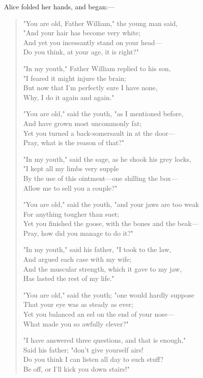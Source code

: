 Alice folded her hands, and began:—
​
\begin{verse}
\footnotesize
"You are old, Father William," the young man said,\\
⁠"And your hair has become very white;\\
And yet you incessantly stand on your head—\\
⁠Do you think, at your age, it is right?"

"In my youth," Father William replied to his son,\\
⁠"I feared it might injure the brain;\\
But now that I'm perfectly sure I have none,\\
⁠Why, I do it again and again."

"You are old," said the youth, "as I mentioned before,\\
⁠And have grown most uncommonly fat;\\
Yet you turned a back-somersault in at the door—\\
⁠Pray, what is the reason of that?"

"In my youth," said the sage, as he shook his grey locks,\\
⁠"I kept all my limbs very supple\\
By the use of this ointment—one shilling the box—\\
⁠Allow me to sell you a couple?"

"You are old," said the youth, "and your jaws are too weak\\
⁠For anything tougher than suet;\\
Yet you finished the goose, with the bones and the beak—\\
⁠Pray, how did you manage to do it?"

"In my youth," said his father, "I took to the law,\\
⁠And argued each case with my wife;\\
And the muscular strength, which it gave to my jaw,\\
⁠Has lasted the rest of my life."

"You are old," said the youth; "one would hardly suppose\\
⁠That your eye was as steady as ever;\\
Yet you balanced an eel on the end of your nose—\\
⁠What made you so awfully clever?"

"I have answered three questions, and that is enough,"\\
⁠Said his father; "don't give yourself airs!\\
Do you think I can listen all day to such stuff?\\
⁠Be off, or I'll kick you down stairs!"
\end{verse}

